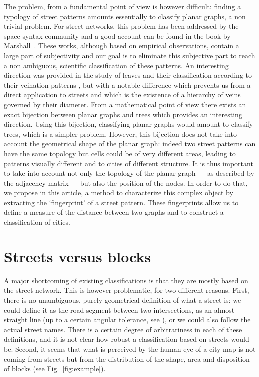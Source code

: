 The problem, from a fundamental point of view is however difficult: finding a
typology of street patterns amounts essentially to classify planar graphs, a non
trivial problem. For street networks, this problem has been addressed by the
space syntax community \cite{Hillier:1984,Penn:2003} and a good account can be found in
the book by Marshall~\cite{Marshall:2004}. These works, although based on
empirical observations, contain a large part of subjectivity and our goal is to
eliminate this subjective part to reach a non ambiguous, scientific
classification of these patterns. An interesting direction was provided in the
study of leaves and their classification according to their veination patterns
\cite{Katifori:2012,Mileyko:2012}, but with a notable difference which prevents us
from a direct application to streets and which is the existence of a hierarchy
of veins governed by their diameter. From a mathematical point of view there
exists an exact bijection between planar graphs and trees \cite{Bouttier:2004} which
provides an interesting direction. Using this bijection, classifying planar
graphs would amount to classify trees, which is a simpler problem. However, this
bijection does not take into account the geometrical shape of the planar graph:
indeed two street patterns can have the same topology but cells could be of very
different areas, leading to patterns visually different and to cities of
different structure. It is thus important to take into account not only the
topology of the planar graph --- as described by the adjacency matrix --- but
also the position of the nodes. In order to do that, we propose in this article,
a method to characterize this complex object by extracting the `fingerprint' of
a street pattern. These fingerprints allow us to define a measure of the
distance between two graphs and to construct a classification of cities.


\section{Streets versus blocks}

A major shortcoming of existing classifications  is that they are mostly based
on the street network. This is however problematic, for two different reasons.
First, there is no unambiguous, purely geometrical definition of what a street
is: we could define it as the road segment between two intersections, as an
almost straight line (up to a certain angular tolerance, see \cite{Porta:2006}), or we
could also follow the actual street names. There is a certain degree of
arbitrariness in each of these definitions, and it is not clear how robust a
classification based on streets would be. Second, it seems that what is
perceived by the human eye of a city map is not coming from streets but from the
distribution of the shape, area and disposition of blocks (see
Fig.~\ref{fig:example}). 

